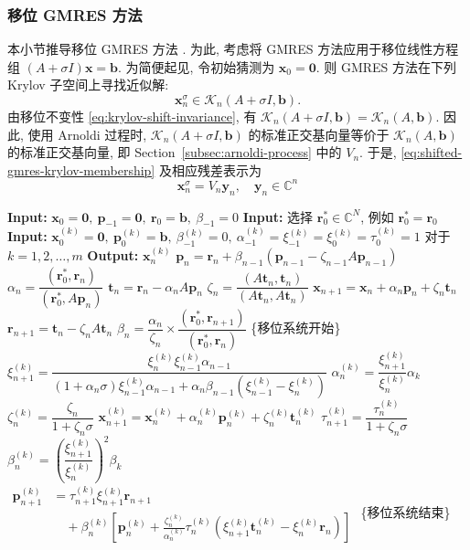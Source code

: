 \subsubsection{{移位 GMRES 方法}}\label{subsec:shifted-gmres}
{本小节推导移位 GMRES 方法 . 为此, 考虑将 GMRES 方法应用于移位线性方程组 $(A+\sigma I)\bm x=\bm b$. 为简便起见, 令初始猜测为 $\bm x_0=\bm0$. 则 GMRES 方法在下列 Krylov 子空间上寻找近似解:}
\begin{equation}\label{eq:shifted-gmres-krylov-membership}\bm x_n^{\sigma}\in\mathcal K_n(A+\sigma I,\bm b).\end{equation}
{由移位不变性 \eqref{eq:krylov-shift-invariance}, 有 $\mathcal K_n(A+\sigma I,\bm b)=\mathcal K_n(A,\bm b)$. 因此, 使用 Arnoldi 过程时, $\mathcal K_n(A+\sigma I,\bm b)$ 的标准正交基向量等价于 $\mathcal K_n(A,\bm b)$ 的标准正交基向量, 即 Section\ \ref{subsec:arnoldi-process} 中的 $V_n$. 于是, \eqref{eq:shifted-gmres-krylov-membership} 及相应残差表示为}
\[\bm x_n^{\sigma}=V_n\bm y_n,\quad\bm y_n\in\mathbb C^n\]
\begin{algorithm}[H]\caption{{移位 BiCGSTAB 方法}}\label{alg:shifted-bicgstab}\begin{algorithmic}[1]
\Statex\textbf{Input:} $\bm x_0=\bm0,\ \bm p_{-1}=\bm0,\ \bm r_0=\bm b,\ \beta_{-1}=0$
\Statex\textbf{Input:} {选择 $\bm r_0^*\in\mathbb C^N$, 例如 $\bm r_0^*=\bm r_0$}
\Statex\textbf{Input:} $\bm x_0^{(k)}=\bm0,\ \bm p_0^{(k)}=\bm b,\ \beta_{-1}^{(k)}=0,\ \alpha_{-1}^{(k)}=\xi_{-1}^{(k)}=\xi_0^{(k)}=\tau_0^{(k)}=1$ {对于} $k=1,2,\ldots,m$
\Statex\textbf{Output:} $\bm x_n^{(k)}$
\State $\bm p_n=\bm r_n+\beta_{n-1}(\bm p_{n-1}-\zeta_{n-1}A\bm p_{n-1})$
\State $\alpha_n=\dfrac{(\bm r_0^*,\bm r_n)}{(\bm r_0^*,A\bm p_n)}$
\State $\bm t_n=\bm r_n-\alpha_nA\bm p_n$
\State $\zeta_n=\dfrac{(A\bm t_n,\bm t_n)}{(A\bm t_n,A\bm t_n)}$
\State $\bm x_{n+1}=\bm x_n+\alpha_n\bm p_n+\zeta_n\bm t_n$
\State $\bm r_{n+1}=\bm t_n-\zeta_nA\bm t_n$
\State $\beta_n=\dfrac{\alpha_n}{\zeta_n}\times\dfrac{(\bm r_0^*,\bm r_{n+1})}{(\bm r_0^*,\bm r_n)}$
\State \{{移位系统开始}\}
\State $\xi_{n+1}^{(k)}=\dfrac{\xi_n^{(k)}\xi_{n-1}^{(k)}\alpha_{n-1}}{(1+\alpha_n\sigma)\xi_{n-1}^{(k)}\alpha_{n-1}+\alpha_n\beta_{n-1}(\xi_{n-1}^{(k)}-\xi_n^{(k)})}$
\State $\alpha_n^{(k)}=\dfrac{\xi_{n+1}^{(k)}}{\xi_n^{(k)}}\alpha_k$
\State $\zeta_n^{(k)}=\dfrac{\zeta_n}{1+\zeta_n\sigma}$
\State $\bm x_{n+1}^{(k)}=\bm x_n^{(k)}+\alpha_n^{(k)}\bm p_n^{(k)}+\zeta_n^{(k)}\bm t_n^{(k)}$
\State $\tau_{n+1}^{(k)}=\dfrac{\tau_n^{(k)}}{1+\zeta_n\sigma}$
\State $\beta_n^{(k)}=\left(\dfrac{\xi_{n+1}^{(k)}}{\xi_n^{(k)}}\right)^2\beta_k$
\State $\begin{aligned}\bm p_{n+1}^{(k)}&=\tau_{n+1}^{(k)}\xi_{n+1}^{(k)}\bm r_{n+1}\\&\quad+\beta_n^{(k)}\left[\bm p_n^{(k)}+\frac{\zeta_n^{(k)}}{\alpha_n^{(k)}}\tau_n^{(k)}(\xi_{n+1}^{(k)}\bm t_n^{(k)}-\xi_n^{(k)}\bm r_n)\right]\end{aligned}$
\EndFor
\State \{{移位系统结束}\}
\EndFor\end{algorithmic}\end{algorithm}
